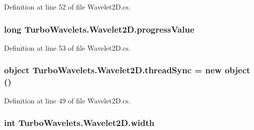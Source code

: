 \-Definition at line 52 of file \-Wavelet2\-D.\-cs.

\hypertarget{class_turbo_wavelets_1_1_wavelet2_d_ad2fad1f07e9e5c4901c0cdc925991e49}{
\subsubsection[{progress\-Value}]{\setlength{\rightskip}{0pt plus 5cm}long {\bf \-Turbo\-Wavelets.\-Wavelet2\-D.\-progress\-Value}}}\label{class_turbo_wavelets_1_1_wavelet2_d_ad2fad1f07e9e5c4901c0cdc925991e49}


\-Definition at line 53 of file \-Wavelet2\-D.\-cs.

\hypertarget{class_turbo_wavelets_1_1_wavelet2_d_ad69614eed43d939d02cf11076f95adee}{
\subsubsection[{thread\-Sync}]{\setlength{\rightskip}{0pt plus 5cm}object {\bf \-Turbo\-Wavelets.\-Wavelet2\-D.\-thread\-Sync} = new object ()}}\label{class_turbo_wavelets_1_1_wavelet2_d_ad69614eed43d939d02cf11076f95adee}


\-Definition at line 49 of file \-Wavelet2\-D.\-cs.

\hypertarget{class_turbo_wavelets_1_1_wavelet2_d_aaa4b3711957fe1798980e6891331a08d}{
\subsubsection[{width}]{\setlength{\rightskip}{0pt plus 5cm}int {\bf \-Turbo\-Wavelets.\-Wavelet2\-D.\-width}}}\label{class_turbo_wavelets_1_1_wavelet2_d_aaa4b3711957fe1798980e6891331a08d}


